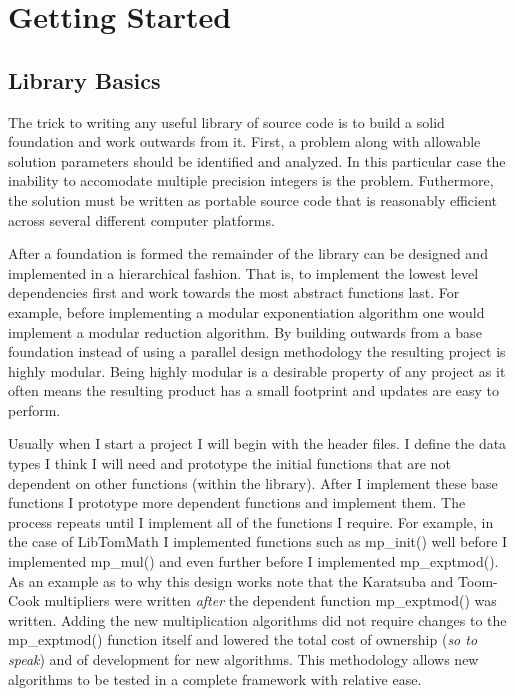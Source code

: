 \documentclass[b5paper]{book}
\begin{document}
\chapter{Getting Started}
\section{Library Basics}
The trick to writing any useful library of source code is to build a solid foundation and work outwards from it.  First, 
a problem along with allowable solution parameters should be identified and analyzed.  In this particular case the 
inability to accomodate multiple precision integers is the problem.  Futhermore, the solution must be written
as portable source code that is reasonably efficient across several different computer platforms.

After a foundation is formed the remainder of the library can be designed and implemented in a hierarchical fashion.  
That is, to implement the lowest level dependencies first and work towards the most abstract functions last.  For example, 
before implementing a modular exponentiation algorithm one would implement a modular reduction algorithm.
By building outwards from a base foundation instead of using a parallel design methodology the resulting project is 
highly modular.  Being highly modular is a desirable property of any project as it often means the resulting product
has a small footprint and updates are easy to perform.  

Usually when I start a project I will begin with the header files.  I define the data types I think I will need and 
prototype the initial functions that are not dependent on other functions (within the library).  After I 
implement these base functions I prototype more dependent functions and implement them.   The process repeats until
I implement all of the functions I require.  For example, in the case of LibTomMath I implemented functions such as 
mp\_init() well before I implemented mp\_mul() and even further before I implemented mp\_exptmod().  As an example as to 
why this design works note that the Karatsuba and Toom-Cook multipliers were written \textit{after} the 
dependent function mp\_exptmod() was written.  Adding the new multiplication algorithms did not require changes to the 
mp\_exptmod() function itself and lowered the total cost of ownership (\textit{so to speak}) and of development 
for new algorithms.  This methodology allows new algorithms to be tested in a complete framework with relative ease.
\end{document}
